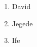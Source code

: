 \documentclass{article}
\begin{document}
	
	\begin{enumerate}
		\item David
		\item Jegede
		\item Ife
	\end{enumerate}
\end{document}
